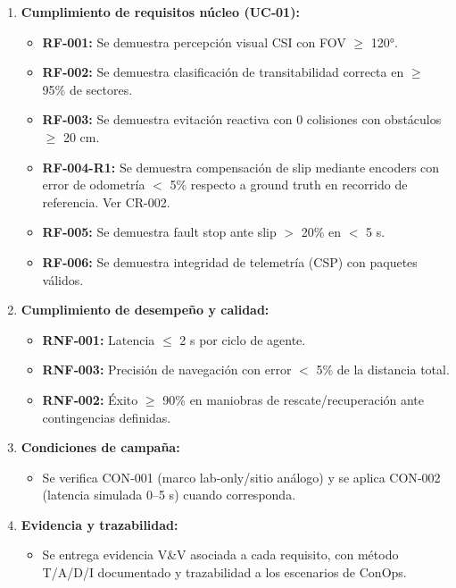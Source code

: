 \begin{enumerate}
    \item \textbf{Cumplimiento de requisitos núcleo (UC‑01):}
    \begin{itemize}
        \item \textbf{RF‑001:} Se demuestra percepción visual CSI con FOV $\ge$ 120°. \cite{omg_sysml_mbse, nasa_cm, segoldmine_ppi}  
        \item \textbf{RF‑002:} Se demuestra clasificación de transitabilidad correcta en $\ge$ 95\% de sectores. \cite{omg_sysml_mbse, nasa_cm, segoldmine_ppi}  
        \item \textbf{RF‑003:} Se demuestra evitación reactiva con 0 colisiones con obstáculos $\ge$ 20 cm. \cite{omg_sysml_mbse, nasa_cm, segoldmine_ppi}  
        \item \textbf{RF‑004-R1:} Se demuestra compensación de slip mediante encoders con error de odometría $<$ 5\% respecto a ground truth en recorrido de referencia. Ver CR-002. \cite{nasa_cm, segoldmine_ppi, omg_sysml_mbse}
        \item \textbf{RF‑005:} Se demuestra fault stop ante slip $>$ 20\% en $<$ 5 s. \cite{omg_sysml_mbse, nasa_cm, segoldmine_ppi}  
        \item \textbf{RF‑006:} Se demuestra integridad de telemetría (CSP) con paquetes válidos. \cite{nasa_cm, segoldmine_ppi, omg_sysml_mbse}  
    \end{itemize}

    \item \textbf{Cumplimiento de desempeño y calidad:}
    \begin{itemize}
        \item \textbf{RNF‑001:} Latencia $\le$ 2 s por ciclo de agente. \cite{omg_sysml_mbse, nasa_cm, segoldmine_ppi}  
        \item \textbf{RNF‑003:} Precisión de navegación con error $<$ 5\% de la distancia total. \cite{omg_sysml_mbse, nasa_cm, segoldmine_ppi}  
        \item \textbf{RNF‑002:} Éxito $\ge$ 90\% en maniobras de rescate/recuperación ante contingencias definidas. \cite{omg_sysml_mbse, nasa_cm, segoldmine_ppi}  
    \end{itemize}

    \item \textbf{Condiciones de campaña:}
    \begin{itemize}
        \item Se verifica CON‑001 (marco lab‑only/sitio análogo) y se aplica CON‑002 (latencia simulada 0–5 s) cuando corresponda. \cite{nasa_cm, segoldmine_ppi}  
    \end{itemize}

    \item \textbf{Evidencia y trazabilidad:}
    \begin{itemize}
        \item Se entrega evidencia V\&V asociada a cada requisito, con método T/A/D/I documentado y trazabilidad a los escenarios de ConOps. \cite{nasa_cm, segoldmine_ppi, omg_sysml_mbse} 
    \end{itemize}
\end{enumerate}

